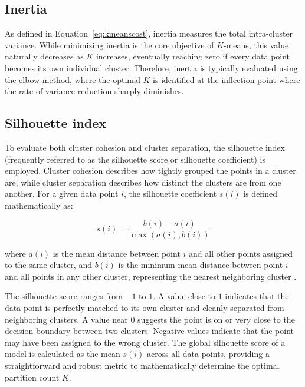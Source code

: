         \subsection{Inertia}
        As defined in Equation~\ref{eq:kmeanscost}, inertia measures the total intra-cluster variance.
        While minimizing inertia is the core objective of $K$-means, this value naturally decreases as $K$ increases, eventually reaching zero if every data point becomes its own individual cluster.
        Therefore, inertia is typically evaluated using the elbow method, where the optimal $K$ is identified at the inflection point where the rate of variance reduction sharply diminishes.
        
        \subsection{Silhouette index}
        To evaluate both cluster cohesion and cluster separation, the silhouette index (frequently referred to as the silhouette score or silhouette coefficient) is employed.
        Cluster cohesion describes how tightly grouped the points in a cluster are, while cluster separation describes how distinct the clusters are from one another.
        For a given data point $i$, the silhouette coefficient $s(i)$ is defined mathematically as:
        
        \begin{equation}
            s(i) = \frac{b(i) - a(i)}{\max(a(i), b(i))}
        \end{equation}
        
        where $a(i)$ is the mean distance between point $i$ and all other points assigned to the same cluster, and $b(i)$ is the minimum mean distance between point $i$ and all points in any other cluster, representing the nearest neighboring cluster \cite{wilbert_recency_2023}.
        
        The silhouette score ranges from $-1$ to $1$.
        A value close to $1$ indicates that the data point is perfectly matched to its own cluster and cleanly separated from neighboring clusters.
        A value near $0$ suggests the point is on or very close to the decision boundary between two clusters.
        Negative values indicate that the point may have been assigned to the wrong cluster.
        The global silhouette score of a model is calculated as the mean $s(i)$ across all data points, providing a straightforward and robust metric to mathematically determine the optimal partition count $K$.
        

